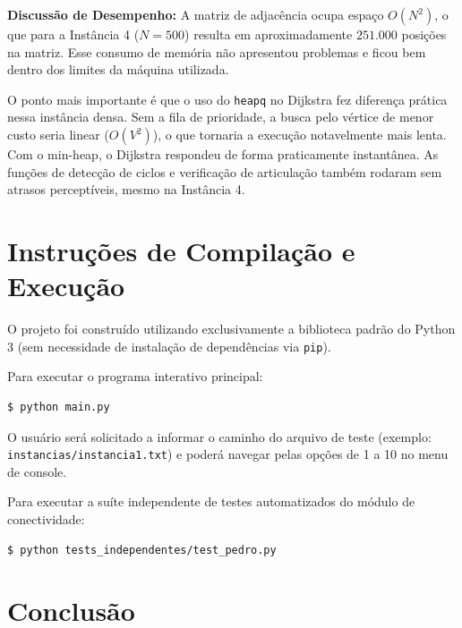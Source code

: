 \documentclass[12pt,a4paper]{article}
\begin{document}
\textbf{Discussão de Desempenho:} A matriz de adjacência ocupa espaço $O(N^2)$, o que para a Instância 4 ($N=500$) resulta em aproximadamente $251.000$ posições na matriz. Esse consumo de memória não apresentou problemas e ficou bem dentro dos limites da máquina utilizada.

O ponto mais importante é que o uso do \texttt{heapq} no Dijkstra fez diferença prática nessa instância densa. Sem a fila de prioridade, a busca pelo vértice de menor custo seria linear ($O(V^2)$), o que tornaria a execução notavelmente mais lenta. Com o min-heap, o Dijkstra respondeu de forma praticamente instantânea. As funções de detecção de ciclos e verificação de articulação também rodaram sem atrasos perceptíveis, mesmo na Instância 4.

\section{Instruções de Compilação e Execução}

O projeto foi construído utilizando exclusivamente a biblioteca padrão do Python 3 (sem necessidade de instalação de dependências via \texttt{pip}).

Para executar o programa interativo principal:
\begin{lstlisting}[language=bash, numbers=none]
$ python main.py
\end{lstlisting}

O usuário será solicitado a informar o caminho do arquivo de teste (exemplo: \texttt{instancias/instancia1.txt}) e poderá navegar pelas opções de 1 a 10 no menu de console.

Para executar a suíte independente de testes automatizados do módulo de conectividade:
\begin{lstlisting}[language=bash, numbers=none]
$ python tests_independentes/test_pedro.py
\end{lstlisting}

\section{Conclusão}
\end{document}
